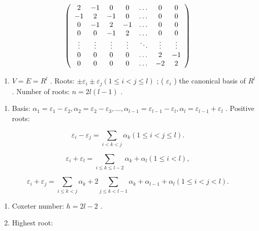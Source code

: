 \[
\left( \begin{array}{c c c c c c c} 2 & - 1 & 0 & 0 & \dots & 0 & 0 \\ - 1 & 2 & - 1 & 0 & \dots & 0 & 0 \\ 0 & - 1 & 2 & - 1 & \dots & 0 & 0 \\ 0 & 0 & - 1 & 2 & \dots & 0 & 0 \\ \vdots & \vdots & \vdots & \vdots & \ddots & \vdots & \vdots \\ 0 & 0 & 0 & 0 & \dots & 2 & - 1 \\ 0 & 0 & 0 & 0 & \dots & - 2 & 2 \end{array} \right)
\]


\begin{enumerate}
\def\labelenumi{(\Roman{enumi})}
\tightlist
\item
  \(V = E = R^{l}\) . Roots: \(\pm\varepsilon_{i}\pm\varepsilon_{j}(1\leqslant i<j\leqslant l)\) ; ( \(\varepsilon_{i}\) ) the canonical basis of \(R^{l}\) . Number of roots: \(n = 2l(l - 1)\) .
\end{enumerate}

\begin{enumerate}
\def\labelenumi{(\Roman{enumi})}
\setcounter{enumi}{1}
\tightlist
\item
  Basis: \(\alpha_{1} = \varepsilon_{1} - \varepsilon_{2},\alpha_{2} = \varepsilon_{2} - \varepsilon_{3},\ldots ,\alpha_{l - 1} = \varepsilon_{l - 1} - \varepsilon_{l},\alpha_{l} = \varepsilon_{l - 1} + \varepsilon_{l}\) . Positive roots:
\end{enumerate}

\[
\varepsilon_ {i} - \varepsilon_ {j} = \sum_ {i <   k <   j} \alpha_ {k} (1 \leqslant i <   j \leqslant l).
\]

\[
\varepsilon_ {i} + \varepsilon_ {l} = \sum_ {i \leqslant k \leqslant l - 2} \alpha_ {k} + \alpha_ {l} (1 \leqslant i <   l),
\]

\[
\varepsilon_ {i} + \varepsilon_ {j} = \sum_ {i \leqslant k <   j} \alpha_ {k} + 2 \sum_ {j \leqslant k <   l - 1} \alpha_ {k} + \alpha_ {l - 1} + \alpha_ {l} (1 \leqslant i <   j <   l).
\]

\begin{enumerate}
\def\labelenumi{(\Roman{enumi})}
\setcounter{enumi}{2}
\item
  Coxeter number: \(h = 2l - 2\) .
\item
  Highest root:
\end{enumerate}

